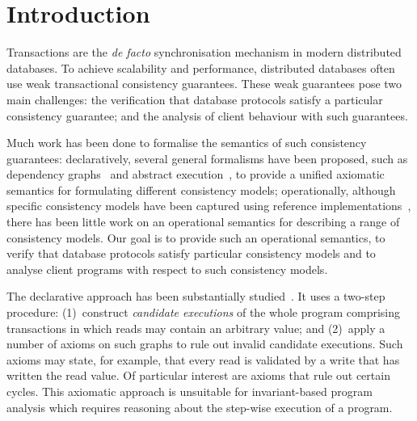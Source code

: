 \section{Introduction}
\label{sec:intro}

Transactions are the \emph{de facto} synchronisation mechanism in
modern distributed databases.  To achieve scalability and performance,
distributed databases often use weak transactional consistency
guarantees. These weak guarantees pose two main challenges: the
verification that database protocols satisfy a particular consistency
guarantee; and the analysis of client behaviour with such guarantees.

Much work has been done to formalise the semantics of such consistency
guarantees:
declaratively, several {general} formalisms have been proposed, such as
dependency graphs~\cite{adya} and abstract
execution~\cite{ev_transactions}, to provide a unified axiomatic semantics for
formulating different consistency models;
operationally, although {specific} consistency models have been
captured 
using reference implementations~\cite{si,PSI,PSI-RA},
there has been little work on   an 
operational semantics for describing a range of consistency models.
Our goal is to provide such an  operational semantics, 
 to verify that database protocols satisfy 
particular consistency models and to analyse client programs with
respect to 
such consistency models.  


The declarative approach has been substantially
studied~\cite{.....}. It uses  a two-step procedure: (1)~construct
{\em candidate executions} of the whole program comprising
transactions in which reads may contain an arbitrary value; and 
(2)~apply a number of axioms on such graphs to rule out invalid candidate
executions.  Such axioms may state, for example, that every read is
validated by a write that has written the read value. Of particular
interest are axioms that rule out certain cycles. This
axiomatic approach is unsuitable for invariant-based program analysis 
which requires reasoning about the step-wise execution of a
program. 

